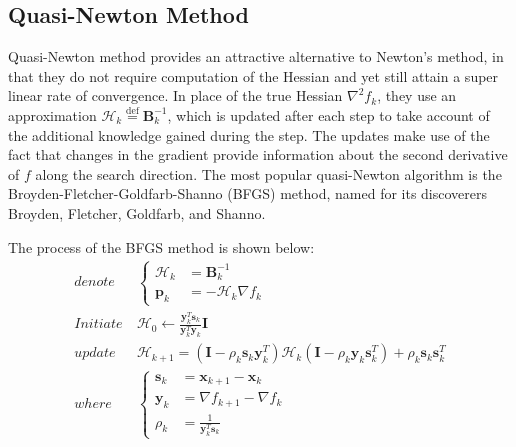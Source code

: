 \subsection{Quasi-Newton Method}\label{sec:BFGS}
Quasi-Newton method provides an attractive alternative to Newton's method, in that they do not require computation of the Hessian and yet still attain a super linear rate of convergence. In place of the true Hessian $\nabla^2 f_k$, they use an approximation $\mathcal{H}_k \stackrel{\text{def}}{=} \textbf{B}_k^{-1}$, which is updated after each step to take account of the additional knowledge gained during the step. The updates make use of the fact that changes in the gradient provide information about the second derivative of $f$ along the search direction. The most popular quasi-Newton algorithm is the Broyden-Fletcher-Goldfarb-Shanno (BFGS) method, named for its discoverers Broyden, Fletcher, Goldfarb, and Shanno. \cite{Nocedal2006}

The process of the BFGS method is shown below:
\begin{align}
  denote   & \                       \left\{
  \begin{array}{ll}
    \mathcal{H}_k & = \textbf{B}_k^{-1}          \\
    \textbf{p}_k & = -\mathcal{H}_k \nabla f_{k}
  \end{array}
  \right.                                                                                                                                                                                                        \\
  Initiate & \ \mathcal{H}_0     \leftarrow \frac{\textbf{y}_k^T\textbf{s}_k}{\textbf{y}_k^T\textbf{y}_k}\textbf{I}                                                           \label{eq:BFGS_initiate_H_0}        \\
  update   & \ \mathcal{H}_{k+1}  = (\textbf{I} - \rho_k\textbf{s}_k\textbf{y}_k^T) \mathcal{H}_{k} (\textbf{I} - \rho_k\textbf{y}_k\textbf{s}_k^T) +\rho_k\textbf{s}_k\textbf{s}_k^T \label{eq:BFGS_update_H_k+1} \\
  where    & \                        \left\{
  \begin{array}{ll}
    \textbf{s}_k & = \textbf{x}_{k+1} - \textbf{x}_{k}                               \\
    \textbf{y}_k & = \nabla f_{k+1} - \nabla f_{k}                                   \\
    \rho_k       & = \frac{1}{\textbf{y}_k^T\textbf{s}_k} \label{eq:BFGS_calc_rho_k}
  \end{array}
  \right.
\end{align}

